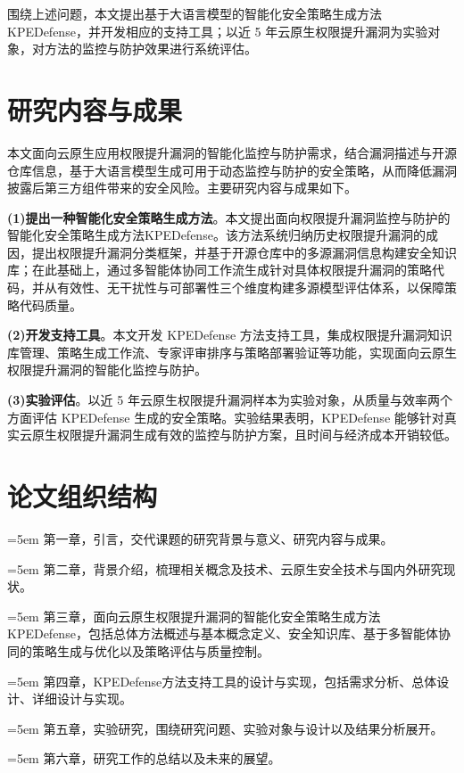 围绕上述问题，本文提出基于大语言模型的智能化安全策略生成方法 KPEDefense，并开发相应的支持工具；以近 5 年云原生权限提升漏洞为实验对象，对方法的监控与防护效果进行系统评估。

\section{研究内容与成果}
本文面向云原生应用权限提升漏洞的智能化监控与防护需求，结合漏洞描述与开源仓库信息，基于大语言模型生成可用于动态监控与防护的安全策略，从而降低漏洞披露后第三方组件带来的安全风险。主要研究内容与成果如下。

\textbf{(1)提出一种智能化安全策略生成方法}。本文提出面向权限提升漏洞监控与防护的智能化安全策略生成方法KPEDefense。该方法系统归纳历史权限提升漏洞的成因，提出权限提升漏洞分类框架，并基于开源仓库中的多源漏洞信息构建安全知识库；在此基础上，通过多智能体协同工作流生成针对具体权限提升漏洞的策略代码，并从有效性、无干扰性与可部署性三个维度构建多源模型评估体系，以保障策略代码质量。

\textbf{(2)开发支持工具}。本文开发 KPEDefense 方法支持工具，集成权限提升漏洞知识库管理、策略生成工作流、专家评审排序与策略部署验证等功能，实现面向云原生权限提升漏洞的智能化监控与防护。

\textbf{(3)实验评估}。以近 5 年云原生权限提升漏洞样本为实验对象，从质量与效率两个方面评估 KPEDefense 生成的安全策略。实验结果表明，KPEDefense 能够针对真实云原生权限提升漏洞生成有效的监控与防护方案，且时间与经济成本开销较低。


\section{论文组织结构}

\noindent\hangindent=5em 第一章，\quad 引言，交代课题的研究背景与意义、研究内容与成果。

\noindent\hangindent=5em 第二章，\quad 背景介绍，梳理相关概念及技术、云原生安全技术与国内外研究现状。

\noindent\hangindent=5em 第三章，\quad 面向云原生权限提升漏洞的智能化安全策略生成方法KPEDefense，包括总体方法概述与基本概念定义、安全知识库、基于多智能体协同的策略生成与优化以及策略评估与质量控制。

\noindent\hangindent=5em 第四章，\quad KPEDefense方法支持工具的设计与实现，包括需求分析、总体设计、详细设计与实现。

\noindent\hangindent=5em 第五章，\quad 实验研究，围绕研究问题、实验对象与设计以及结果分析展开。

\noindent\hangindent=5em 第六章，\quad 研究工作的总结以及未来的展望。

